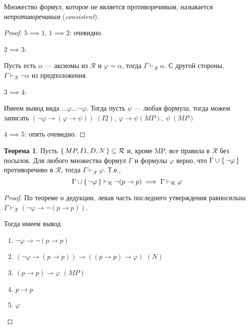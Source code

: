 \documentclass[12pt]{article}
\let\im\rightarrow
\let\n\neg
\let\un\cup
\let\sus\subseteq
\theoremstyle{definition}
\newtheorem{theorem}{Теорема}[section]
\theoremstyle{statement}
\theoremstyle{theorem}
\begin{document}
Множество формул, которое не является противоречивым, называется
\textit{непротиворечивым} (\textit{consistent}).

\begin{proof}
  $5 \implies 1$, $1 \implies 2$: очевидно.

  $2 \implies 3$:

  Пусть есть $\alpha$ --- аксиомы из $\mathcal{R}$ и $\varphi =
  \alpha$, тогда $\Gamma \vdash_{\mathcal{R}} \alpha$. С другой
  стороны, $\Gamma \vdash_{\mathcal{R}} \n \alpha$ из предположения.

  $3 \implies 4$:

  Имеем вывод вида $\dots \varphi \dots \n \varphi$. Тогда пусть
  $\psi$ --- любая формула, тогда можем записать $(\n \varphi
  \im (\varphi \im \psi))\ (I2),\ \varphi \im \psi (MP),\ \psi\ (MP)$

  $4 \implies 5$: опять очевидно.
\end{proof}

\begin{theorem}
  Пусть $\set{MP, I1, D, N} \sus \mathcal{R}$ и, кроме MP, все
  правила в $\mathcal{R}$ без посылок. Для любого множества формул
  $\Gamma$ и формулы $\varphi$ верно, что $\Gamma \un \set{\n
  \varphi}$ противоречиво в $\mathcal{R}$, тогда $\Gamma
  \vdash_{\mathcal{R}} \varphi$. Т.е.,
  \begin{displaymath}
    \Gamma \un \set{\n \varphi} \vdash_{\mathcal{R}} \n (p \im p)
    \implies \Gamma \vdash_{\mathcal{R}} \varphi
  \end{displaymath}
  \begin{proof}
    По теореме о дедукции, левая часть последнего утверждения
    равносильна $\Gamma \vdash_{\mathcal{R}} (\n \varphi \im \n (p \im p))$.

    Тогда имеем вывод
    \begin{enumerate}
      \item $\n \varphi \im \n (p \im p)$

      \item $(\n \varphi \im (p \im p)) \im ((p \im p) \im \varphi)$ $(N)$

      \item $(p \im p) \im \varphi$ $(MP)$

      \item $p \im p$

      \item $\varphi$
    \end{enumerate}
  \end{proof}
\end{theorem}
\end{document}
